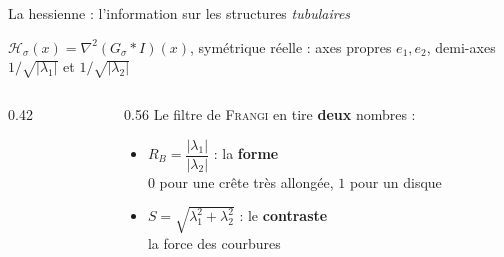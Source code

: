 \begin{frame}[t]{La hessienne : l'information sur les structures \emph{tubulaires}}
    \vspace{0.10cm}
    \begin{center}
        {\small $\mathcal H_\sigma(x)=\nabla^{2}\!\left(G_\sigma * I\right)\!(x)$, symétrique réelle :
        axes propres $e_1,e_2$, demi-axes $1/\sqrt{|\lambda_1|}$ et $1/\sqrt{|\lambda_2|}$}
    \end{center}

    \vspace{0.06cm}
    \begin{columns}[c,onlytextwidth]
        \begin{column}{0.42\textwidth}
            \begin{center}
                \resizebox{0.80\linewidth}{!}{}
            \end{center}
        \end{column}
        \begin{column}{0.56\textwidth}
            \small
            Le filtre de \textsc{Frangi}  en tire \textbf{deux} nombres :
            \vspace{0.14cm}
            \begin{itemize}
                \setlength{\itemsep}{7pt}
                \item $R_B=\dfrac{|\lambda_1|}{|\lambda_2|}$ : la \textbf{forme}\\[1pt]
                {\footnotesize $0$ pour une crête très allongée, $1$ pour un disque}
                \item $S=\sqrt{\lambda_1^{2}+\lambda_2^{2}}$ : le \textbf{contraste}\\[1pt]
                {\footnotesize la force des courbures}
            \end{itemize}
        \end{column}
    \end{columns}

    \vspace{0.04cm}
    \begin{center}
    \end{center}
\end{frame}

